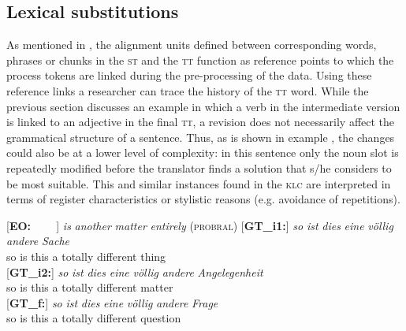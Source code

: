 \documentclass[output=paper]{LSP/langsci}
\begin{document}
\subsection{Lexical substitutions} \label{sec:1:3:5}
As mentioned in , the alignment units defined between corresponding words, phrases or chunks in the \textsc{st} and the \textsc{tt} function as reference points to which the process tokens are linked during the pre-processing of the data. Using these reference links a researcher can trace the history of the \textsc{tt} word. While the previous section discusses an example in which a verb in the intermediate version is linked to an adjective in the final \textsc{tt}, a revision does not necessarily affect the grammatical structure of a sentence. Thus, as is shown in example , the changes could also be at a lower level of complexity: in this sentence only the noun slot is repeatedly modified before the translator finds a solution that s/he considers to be most suitable. This and similar instances found in the \textsc{klc} are interpreted in terms of register characteristics or stylistic reasons (e.g. avoidance of repetitions).

\ea \label{ex:1:10}
\begin{xlist}
\exi{}[\textbf{EO:~~~~}]{ \emph{is} \emph{another} \emph{matter} \emph{entirely} (\textsc{probral})}
\exi{}[\textbf{GT\_i1:}]{
\gll   \emph{so} \emph{ist} \emph{dies} \emph{eine} \emph{völlig} \emph{andere} \emph{Sache}\\
 so is this a totally different thing\\
 }
 \exi{}[\textbf{GT\_i2:}]{
\gll \emph{so} \emph{ist} \emph{dies} \emph{eine} \emph{völlig} \emph{andere} \emph{Angelegenheit} \\
 so is this a totally different matter\\
 }
 \exi{}[\textbf{GT\_f:}]{
\gll \emph{so} \emph{ist} \emph{dies} \emph{eine} \emph{völlig} \emph{andere} \emph{Frage} \\
 so is this a totally different question\\
 }
\end{xlist}
\z
\end{document}
